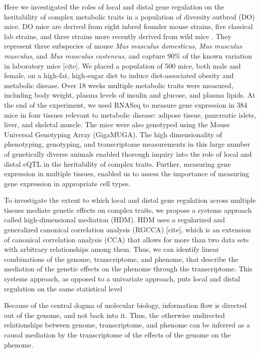 \documentclass[
]{article}
\begin{document}
Here we investigated the roles of local and distal gene regulation on
the heritability of complex metabolic traits in a population of
diversity outbred (DO) mice. DO mice are derived from eight inbred
founder mouse strains, five classical lab strains, and three strains
more recently derived from wild mice \cite{pmid22892839}. They represent
three subspecies of mouse \textit{Mus musculus domesticus},
\textit{Mus musculus musculus}, and \textit{Mus musculus casteneus}, and
capture 90\% of the known variation in laboratory mice {[}cite{]}. We
placed a population of 500 mice, both male and female, on a high-fat,
high-sugar diet \cite{pmid29567659} to induce diet-associated obesity
and metabolic disease. Over 18 weeks multiple metabolic traits were
measured, including body weight, plasma levels of insulin and glucose,
and plasma lipids. At the end of the experiment, we used RNASeq to
measure gene expression in 384 mice in four tissues relevant to
metabolic disease: adipose tissue, pancreatic islets, liver, and
skeletal muscle. The mice were also genotyped using the Mouse Universal
Genotyping Array (GigaMUGA). The high dimensionality of phenotyping,
genotyping, and transcriptome measurements in this large number of
genetically diverse animals enabled thorough inquiry into the role of
local and distal eQTL in the heritability of complex traits. Further,
measuring gene expression in multiple tissues, enabled us to assess the
importance of measuring gene expression in appropriate cell types.

To investigate the extent to which local and distal gene regulation
across multiple tissues mediate genetic effects on complex traits, we
propose a systems approach called high-dimensional mediation (HDM). HDM
uses a regularized and generalized canonical correlation analysis
(RGCCA) {[}cite{]}, which is an extension of canonical correlation
analysis (CCA) that allows for more than two data sets with arbitrary
relationships among them. Thus, we can identify linear combinations of
the genome, transcriptome, and phenome, that describe the mediation of
the genetic effects on the phenome through the transcriptome. This
systems approach, as opposed to a univariate approach, puts local and
distal regulation on the same statistical level

Because of the central dogma of molecular biology, information flow is
directed out of the genome, and not back into it. Thus, the otherwise
undirected relationships between genome, transcriptome, and phenome can
be inferred as a causal mediation by the transcriptome of the effects of
the genome on the phenome.
\end{document}
